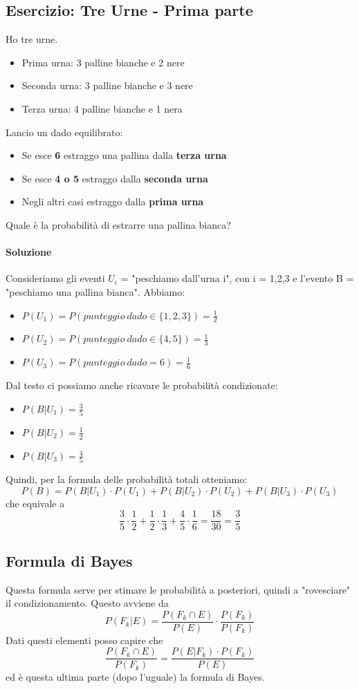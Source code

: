\documentclass{report}
\begin{document}
\subsection{Esercizio: Tre Urne - Prima parte} \label{EsercizioTreUrne1}
Ho tre urne. \begin{itemize}
    \item Prima urna: 3 palline bianche e 2 nere
    \item Seconda urna: 3 palline bianche e 3 nere
    \item Terza urna: 4 palline bianche e 1 nera
\end{itemize}
Lancio un dado equilibrato: \begin{itemize}
    \item Se esce \textbf{6} estraggo una pallina dalla \textbf{terza urna}
    \item Se esce \textbf{4 o 5} estraggo dalla \textbf{seconda urna}
    \item Negli altri casi estraggo dalla \textbf{prima urna}
\end{itemize}
Quale è la probabilità di estrarre una pallina bianca?
\paragraph{Soluzione} Consideriamo gli eventi \(U_i\) = "peschiamo dall'urna i", con i = 1,2,3 e l'evento B = "peschiamo una pallina bianca". Abbiamo: \begin{itemize}
    \item \(P(U_1) = P(punteggio\ dado \in \{1,2,3\}) = \frac{1}{2}\)
    \item \(P(U_2) = P(punteggio\ dado \in \{4,5\}) = \frac{1}{3}\)
    \item \(P(U_3) = P(punteggio\ dado = 6) = \frac{1}{6}\)
\end{itemize}
Dal testo ci possiamo anche ricavare le probabilità condizionate: \begin{itemize}
    \item \(P(B|U_1) = \frac{3}{5}\)
    \item \(P(B|U_2) = \frac{1}{2}\)
    \item \(P(B|U_3) = \frac{4}{5}\)
\end{itemize}
Quindi, per la formula delle probabilità totali otteniamo: \[P(B) = P(B|U_1)\cdot P(U_1) + P(B|U_2)\cdot P(U_2) + P(B|U_3)\cdot P(U_3)\] che equivale a \[\frac{3}{5}\cdot \frac{1}{2} + \frac{1}{2}\cdot \frac{1}{3} + \frac{4}{5}\cdot \frac{1}{6} = \frac{18}{30} = \frac{3}{5}\]
\subsection{Formula di Bayes}
Questa formula serve per stimare le probabilità a posteriori, quindi a "rovesciare" il condizionamento. Questo avviene da
\[P(F_k|E) = \frac{P(F_k \cap E)}{P(E)}\cdot \frac{P(F_k)}{P(F_k)}\] Dati questi elementi posso capire che \[\frac{P(F_k \cap E)}{P(F_k)} = \frac{P(E|F_k)\cdot P(F_k)}{P(E)}\] ed è questa ultima parte (dopo l'uguale) la formula di Bayes.
\end{document}
